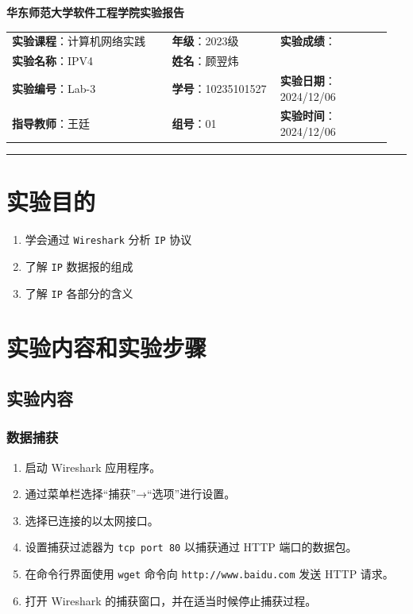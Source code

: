 \documentclass{article}
\begin{document}
	\begin{center}
		{\Large{\textbf{\heiti 华东师范大学软件工程学院实验报告}}}
		\begin{table}[htb]
			\flushleft
			\begin{tabular}{p{0.4\linewidth}p{0.27\linewidth}p{0.28\linewidth}}\\
				\textbf{实验课程}：计算机网络实践  & \textbf{年级}：2023级       & \textbf{实验成绩}：  \\
				\textbf{实验名称}：IPV4 & \textbf{姓名}：顾翌炜         &                 \\
				\textbf{实验编号}：Lab-3     & \textbf{学号}：10235101527 & \textbf{实验日期}：2024/12/06  \\
				\textbf{指导教师}：王廷     & \textbf{组号}：01            & \textbf{实验时间}：2024/12/06  \\ 
			\end{tabular}
		\end{table}
	\end{center}
	\rule{\textwidth}{2pt}
	
	\section{实验目的}
	
	\begin{enumerate}[noitemsep, label={{\arabic*})}]
		\item 学会通过 \texttt{Wireshark} 分析 \texttt{IP} 协议
		\item 了解 \texttt{IP} 数据报的组成
		\item 了解 \texttt{IP} 各部分的含义
	\end{enumerate}
	
	\section{实验内容和实验步骤}
	
	\subsection{实验内容}
	
	\subsubsection{数据捕获}
	\begin{enumerate}
		\item 启动 Wireshark 应用程序。
		\item 通过菜单栏选择“捕获”→“选项”进行设置。
		\item 选择已连接的以太网接口。
		\item 设置捕获过滤器为 \texttt{tcp port 80} 以捕获通过 HTTP 端口的数据包。
		\item 在命令行界面使用 \texttt{wget} 命令向 \texttt{http://www.baidu.com} 发送 HTTP 请求。
		\item 打开 Wireshark 的捕获窗口，并在适当时候停止捕获过程。
	\end{enumerate}
	
\end{document}
